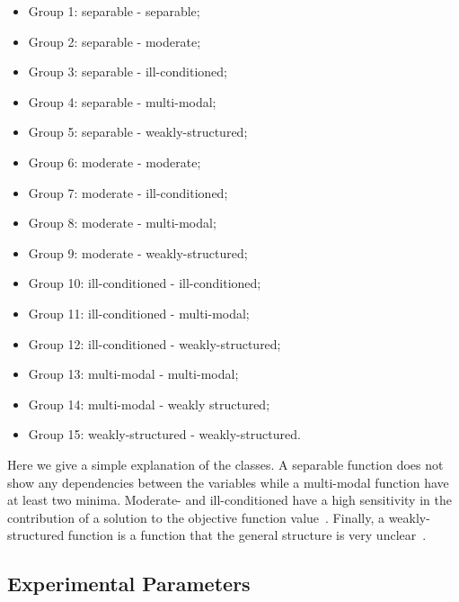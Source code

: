 \begin{itemize}
	\item Group 1: separable - separable;%
    \item Group 2: separable - moderate;%
	\item Group 3: separable - ill-conditioned;%
	\item Group 4: separable - multi-modal;%
	\item Group 5: separable - weakly-structured;%
	\item Group 6: moderate - moderate;%
	\item Group 7: moderate - ill-conditioned;%
	\item Group 8: moderate - multi-modal;%
	\item Group 9: moderate - weakly-structured;%
	\item Group 10: ill-conditioned - ill-conditioned;%
	\item Group 11: ill-conditioned - multi-modal;%
	\item Group 12: ill-conditioned - weakly-structured;%
	\item Group 13: multi-modal - multi-modal;%
	\item Group 14: multi-modal - weakly structured;%
	\item Group 15: weakly-structured - weakly-structured.%
\end{itemize}

Here we give a simple explanation of the classes. A separable function does not show any dependencies between the variables while a multi-modal function have at least two minima. Moderate- and ill-conditioned have a high sensitivity in the contribution of a solution to the objective function value~\cite{hansen2011impacts}. Finally, a weakly-structured function is a function that the general structure is very unclear~\cite{finck2010real}.


\subsection{Experimental Parameters}

